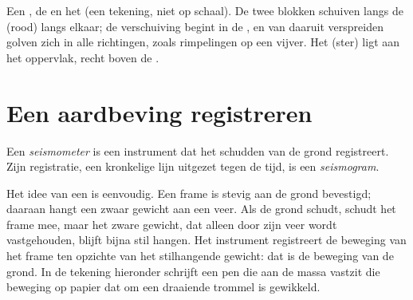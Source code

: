 \begin{omfigure}
{\small Een , de  en het  (een tekening, niet op
schaal). De twee blokken schuiven langs de  (rood) langs elkaar; de
verschuiving begint in de , en van daaruit verspreiden golven zich in
alle richtingen, zoals rimpelingen op een vijver. Het  (ster)
ligt aan het oppervlak, recht boven de .}
\label{fig:g7:earthquakes:fault}
\end{omfigure}


\section{Een aardbeving registreren}

\begin{definition}\label{def:g7:earthquakes:seismometer}
Een \emph{seismometer} is een instrument dat het schudden
van de grond registreert. Zijn registratie, een kronkelige lijn uitgezet
tegen de tijd, is een \emph{seismogram}.
\end{definition}

Het idee van een  is eenvoudig. Een frame is stevig aan de grond
bevestigd; daaraan hangt een zwaar gewicht aan een veer. Als de grond
schudt, schudt het frame mee, maar het zware gewicht, dat alleen door zijn
veer wordt vastgehouden, blijft bijna stil hangen. Het instrument
registreert de beweging van het frame ten opzichte van het stilhangende
gewicht: dat is de beweging van de grond. In de tekening hieronder schrijft
een pen die aan de massa vastzit die beweging op papier dat om een
draaiende trommel is gewikkeld.

